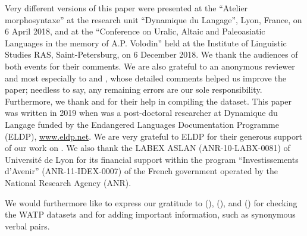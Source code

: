 \documentclass[output=paper,colorlinks,citecolor=brown]{langscibook}
\begin{document}
Very different versions of this paper were presented at the “Atelier morphosyntaxe” at the research unit “Dynamique du Langage”, Lyon, France, on 6 April 2018, and at the “Conference on Uralic, Altaic and Paleoasiatic Languages in the memory of A.P. Volodin” held at the Institute of Linguistic Studies RAS, Saint-Petersburg, on 6 December 2018. We thank the audiences of both events for their comments. We are also grateful to an anonymous reviewer and most especially to  and , whose detailed comments helped us improve the paper; needless to say, any remaining errors are our sole responsibility. Furthermore, we thank  and  for their help in compiling the  dataset. This paper was written in 2019 when  was a post-doctoral researcher at Dynamique du Langage funded by the Endangered Languages
Documentation Programme (ELDP), \url{www.eldp.net}. We are very grateful to ELDP for their generous support of our work on . We also thank the LABEX ASLAN (ANR-10-LABX-0081) of Université de Lyon for its financial support within the program “Investissements d'Avenir” (ANR-11-IDEX-0007) of the French government operated by the National Research Agency (ANR).

We would furthermore like to express our gratitude to   (),  (), and  () for checking the WATP datasets and for adding important information, such as synonymous verbal pairs.

\pagebreak
\end{document}
